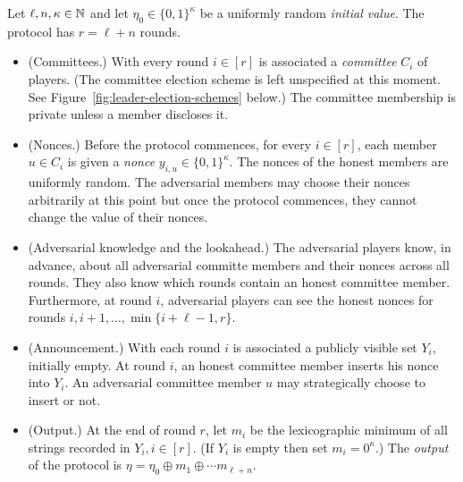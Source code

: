     \begin{definition}\label{def:coin-flipping}
        Let $\ell, n, \kappa \in \mathbb{N}$ and 
        let $\eta_0 \in \{0,1\}^\kappa$ be a uniformly random \emph{initial value}. 
        The protocol has $r = \ell + n$ rounds. 
        \begin{itemize}
            \item (Committees.) 
            With every round $i \in [r]$ is associated 
            a \emph{committee} $C_i$ of players. 
            (The committee election scheme is left unspecified at this moment. 
            See Figure~\ref{fig:leader-election-schemes} below.)
            The committee membership is private unless 
            a member discloses it. 

            \item (Nonces.) 
            Before the protocol commences, 
            for every $i \in [r]$, 
            each member $u \in C_i$ is given a \emph{nonce} $y_{i,u} \in \{0,1\}^\kappa$. 
            The nonces of the honest members are uniformly random. 
            The adversarial members may choose their nonces arbitrarily at this point 
            but once the protocol commences, 
            they cannot change the value of their nonces. 

            \item (Adversarial knowledge and the lookahead.) 
            The adversarial players know, in advance, 
            about all adversarial committe members and 
            their nonces across all rounds.  
            They also know which rounds contain an honest committee member.
            Furthermore, at round $i$, 
            adversarial players can see 
            the honest nonces for rounds $i, i+1, \ldots, \min\{i + \ell - 1, r\}$.

            \item (Announcement.)
            With each round $i$ is associated 
            a publicly visible set $Y_i$, initially empty. 
            At round $i$, 
            an honest committee member inserts his nonce into $Y_i$. 
            An adversarial committee member $u$ may strategically choose to insert or not. 

            \item (Output.)
            At the end of round $r$, 
            let $m_i$ 
            be the lexicographic minimum of all strings recorded in $Y_i, i \in [r]$.
            (If $Y_i$ is empty then set $m_i = 0^\kappa$.)
            The \emph{output} of the protocol is 
            $
                \eta = \eta_0 \oplus m_1 \oplus \cdots m_{\ell + n}
            $. 
        \end{itemize}
    \end{definition}


